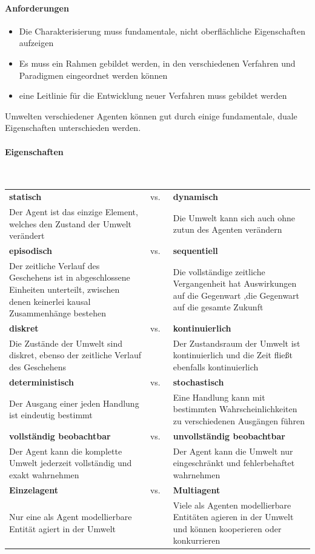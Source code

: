 \paragraph{Anforderungen}
\begin{itemize}
	\item Die Charakterisierung muss fundamentale, nicht oberflächliche Eigenschaften aufzeigen
	\item Es muss ein Rahmen gebildet werden, in den verschiedenen Verfahren und Paradigmen eingeordnet werden können
	\item eine Leitlinie für die Entwicklung neuer Verfahren muss gebildet werden
\end{itemize}
Umwelten verschiedener Agenten können gut durch einige fundamentale, duale Eigenschaften unterschieden werden.
\paragraph{Eigenschaften} \mbox{}
\vspace{1em} \\
\begin{tabular}{p{} p{} p{}}
\textbf{statisch} & \centering vs.\ & \textbf{dynamisch}\\
Der Agent ist das einzige Element, welches den Zustand der Umwelt verändert
& &
Die Umwelt kann sich auch ohne zutun des Agenten verändern
\\
\textbf{episodisch} & \centering vs.\ & \textbf{sequentiell}\\
Der zeitliche Verlauf des Geschehens  ist in abgeschlossene Einheiten unterteilt, zwischen denen keinerlei kausal Zusammenhänge bestehen
& &
Die vollständige zeitliche Vergangenheit hat Auswirkungen auf die Gegenwart ,die Gegenwart auf die gesamte Zukunft
\\
\textbf{diskret} & \centering vs.\ & \textbf{kontinuierlich}\\
Die Zustände der Umwelt sind diskret, ebenso der zeitliche Verlauf des Geschehens
& &
Der Zustandsraum der Umwelt ist kontinuierlich und die Zeit fließt ebenfalls kontinuierlich
\\
\textbf{deterministisch} & \centering vs.\ & \textbf{stochastisch}\\
Der Ausgang einer jeden Handlung ist eindeutig bestimmt
& &
Eine Handlung kann mit bestimmten Wahrscheinlichkeiten zu verschiedenen Ausgängen führen
\\
\textbf{vollständig beobachtbar} & \centering vs.\ & \textbf{unvollständig beobachtbar}\\
Der Agent kann die komplette Umwelt jederzeit vollständig und exakt wahrnehmen
& &
Der Agent kann die Umwelt nur eingeschränkt und fehlerbehaftet wahrnehmen
\\
\textbf{Einzelagent} & \centering vs.\ & \textbf{Multiagent}\\
Nur eine als Agent modellierbare Entität agiert in der Umwelt
& &
Viele als Agenten modellierbare Entitäten agieren in der Umwelt und können kooperieren oder konkurrieren
\end{tabular}
